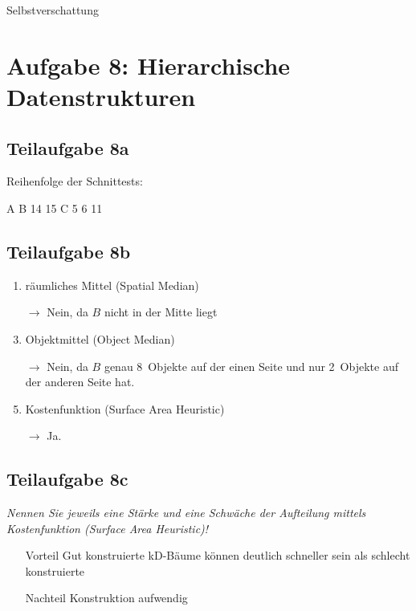 \documentclass[a4paper]{scrartcl}
\begin{document}
Selbstverschattung


\section*{Aufgabe 8: Hierarchische Datenstrukturen}
\subsection*{Teilaufgabe 8a}

Reihenfolge der Schnittests:

A B 14 15 C 5 6 11

\subsection*{Teilaufgabe 8b}
\begin{enumerate}
    \item räumliches Mittel (Spatial Median)
    \item[$\rightarrow$] Nein, da $B$ nicht in der Mitte liegt
    \item Objektmittel (Object Median)
    \item[$\rightarrow$] Nein, da $B$ genau 8~Objekte auf der einen Seite und
                         nur 2~Objekte auf der anderen Seite hat.
    \item Kostenfunktion (Surface Area Heuristic)
    \item[$\rightarrow$] Ja.
\end{enumerate}

\subsection*{Teilaufgabe 8c}
\textit{Nennen Sie jeweils eine Stärke und eine Schwäche der Aufteilung mittels Kostenfunktion (Surface Area Heuristic)!}

\begin{itemize}
    \item[Vorteil] Gut konstruierte kD-Bäume können deutlich schneller sein als schlecht konstruierte
    \item[Nachteil] Konstruktion aufwendig
\end{itemize}
\end{document}
